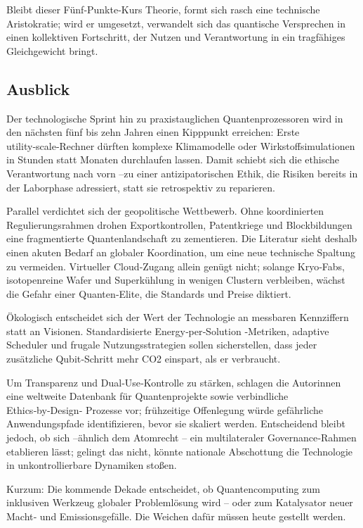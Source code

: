 Bleibt dieser Fünf‑Punkte‑Kurs Theorie, formt sich rasch eine technische Aristokratie; wird er umgesetzt, verwandelt sich das quantische Versprechen in einen kollektiven Fortschritt, der Nutzen und Verantwortung in ein tragfähiges Gleichgewicht bringt.

\cite{noauthor}



\subsection{Ausblick}


Der technologische Sprint hin zu praxistauglichen Quantenprozessoren wird in den nächsten fünf bis zehn Jahren einen Kipppunkt erreichen: Erste utility‑scale‑Rechner dürften komplexe Klimamodelle oder Wirkstoffsimulationen in Stunden statt Monaten durchlaufen lassen. Damit schiebt sich die ethische Verantwortung nach vorn –zu einer antizipatorischen Ethik, die Risiken bereits in der Laborphase adressiert, statt sie retrospektiv zu reparieren.

Parallel verdichtet sich der geopolitische Wettbewerb. Ohne koordinierten Regulierungsrahmen drohen Exportkontrollen, Patentkriege und Blockbildungen eine fragmentierte Quantenlandschaft zu zementieren. Die Literatur sieht deshalb einen akuten Bedarf an globaler Koordination, um eine neue technische Spaltung zu vermeiden. Virtueller Cloud‑Zugang allein genügt nicht; solange Kryo‑Fabs, isotopenreine Wafer und Superkühlung in wenigen Clustern verbleiben, wächst die Gefahr einer Quanten‑Elite, die Standards und Preise diktiert.

Ökologisch entscheidet sich der Wert der Technologie an messbaren Kennziffern statt an Visionen. Standardisierte Energy‑per‑Solution ‑Metriken, adaptive Scheduler und frugale Nutzungsstrategien sollen sicherstellen, dass jeder zusätzliche Qubit‑Schritt mehr CO2 einspart, als er verbraucht.

Um Transparenz und Dual‑Use‑Kontrolle zu stärken, schlagen die Autor\*innen eine weltweite Datenbank für Quantenprojekte sowie verbindliche Ethics‑by‑Design‑ Prozesse vor; frühzeitige Offenlegung würde gefährliche Anwendungspfade identifizieren, bevor sie skaliert werden. Entscheidend bleibt jedoch, ob sich –ähnlich dem Atomrecht – ein multilateraler Governance‑Rahmen etablieren lässt; gelingt das nicht, könnte nationale Abschottung die Technologie in unkontrollierbare Dynamiken stoßen.

Kurzum: Die kommende Dekade entscheidet, ob Quantencomputing zum inklusiven Werkzeug globaler Problemlösung wird – oder zum Katalysator neuer Macht‑ und Emissionsgefälle. Die Weichen dafür müssen heute gestellt werden.


\printbibliography








